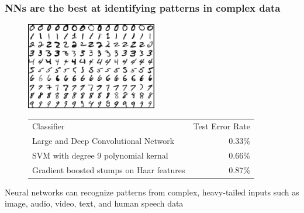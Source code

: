 \documentclass[xcolor={dvipsnames}]{beamer}
\begin{document}
{\begin{columns}
\begin{column}{.15\textwidth}
 \\


\end{column}
\begin{column}{.55\textwidth}

\end{column}
\end{columns}

}


\frame
{
 \frametitle{NNs are the best at identifying patterns in complex data}

\begin{figure}
\centering
\includegraphics[width=2.25in]{stuff/nums.png}

\begin{tabular}{lr}
\\
Classifier & Test Error Rate \\
Large and Deep Convolutional Network & 0.33\%\\
SVM with degree 9 polynomial kernal & 0.66\% \\
Gradient boosted stumps on Haar features & 0.87\%
\end{tabular}
\end{figure}

Neural networks can recognize patterns from complex, heavy-tailed inputs such as image, audio, video, text, and human speech data 
}
\end{document}
